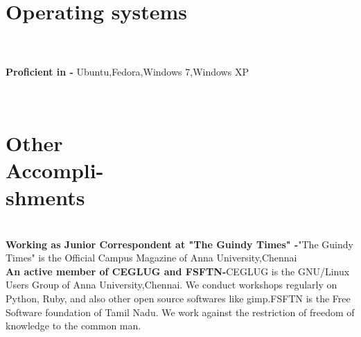 \documentclass[margin,line]{resume}
\begin{document}
\begin{resume}
    \section{\mysidestyle Operating systems}\\ 
\\\textbf{Proficient in -} Ubuntu,Fedora,Windows 7,Windows XP 


	 \\\section{\mysidestyle Other\\Accompli-\\shments}\\ 
    \textbf{Working as Junior Correspondent at "The Guindy Times" -}"The Guindy Times" is the Official Campus Magazine of Anna University,Chennai
\\\textbf{An active member of CEGLUG and FSFTN-}CEGLUG is the GNU/Linux Users Group of Anna University,Chennai. We conduct workshops regularly on Python, Ruby, and also other open source softwares like gimp.FSFTN is the Free Software foundation of Tamil Nadu. We work against the restriction of freedom of knowledge to the common man. 


\end{resume}
\end{document}
